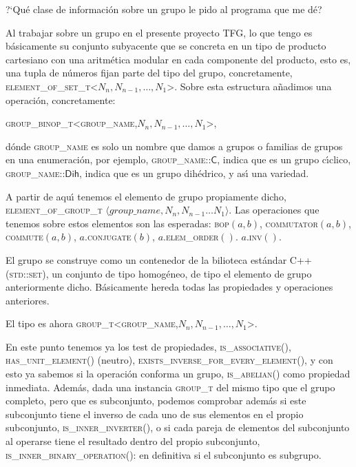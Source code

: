 \documentclass[final,12pt,a4paper,twoside,fleqn]{extbook}
\theoremstyle{definition}
\theoremstyle{remark}
\begin{document}
?`Qu\'e clase de informaci\'on sobre un grupo le pido al programa que me d\'e?

Al trabajar
sobre un grupo en el presente proyecto TFG, lo que tengo es b\'asicamente su conjunto subyacente que se concreta
en un tipo
de producto cartesiano con una aritm\'etica modular en cada componente del producto, esto es, una tupla de n\'umeros
fijan parte del tipo del grupo, concretamente,
\textsc{element\_of\_set\_t<$N_n, N_{n-1},\ldots,N_1$>}. Sobre esta estructura
añadimos una operaci\'on, concretamente:

\textsc{group\_binop\_t<group\_name,$N_n, N_{n-1},\ldots,N_1$>},


d\'onde
\textsc{group\_name} es solo un nombre que damos a grupos o familias de grupos en una enumeraci\'on, por ejemplo,
\textsc{group\_name::$\mathsf{C}$},
indica que es un grupo c{\'{\i}}clico, \textsc{group\_name::$\mathsf{Dih}$}, indica que es un grupo
dih\'edrico, y as{\'{\i}} una variedad.

A partir de aqu{\'{\i}} tenemos el elemento de grupo propiamente dicho,
\textsc{element\_of\_group\_t}
$\langle{group\_name},{N_n, N_{n-1}\ldots N_1}\rangle$.
Las operaciones que tenemos sobre estos elementos son las esperadas:
 \textsc{bop}$(a,b)$, \textsc{commutator}$(a,b)$, \textsc{commute}$(a,b)$, $a.$\textsc{conjugate}$(b)$,
$a.$\textsc{elem\_order}$()$. $a.$\textsc{inv}$()$.

El grupo se construye como un contenedor de
la bilioteca est\'andar C++ (\textsc{std::set}), un conjunto de tipo homog\'eneo,
de tipo el elemento de grupo anteriormente dicho.
B\'asicamente hereda todas las propiedades y operaciones anteriores.


El tipo es ahora \textsc{group\_t<group\_name,$N_n,
N_{n-1},\ldots,N_1$>}.


En este punto tenemos ya los test de propiedades, \textsc{is\_associative()}, \textsc{has\_unit\_element()} (neutro),
\textsc{exists\_inverse\_for\_every\_element()},
y con esto ya sabemos si la operaci\'on conforma un grupo, \textsc{is\_abelian()} como
propiedad inmediata. Adem\'as, dada una instancia \textsc{group\_t} del mismo tipo que el grupo completo,
pero que es subconjunto, podemos comprobar adem\'as si este subconjunto tiene el inverso de cada uno
de sus elementos en el propio subconjunto, \textsc{is\_inner\_inverter()}, o si cada pareja de elementos del subconjunto
al operarse tiene el resultado dentro del propio subconjunto, \textsc{is\_inner\_binary\_operation()}: en definitiva
si el subconjunto es subgrupo.
\end{document}
